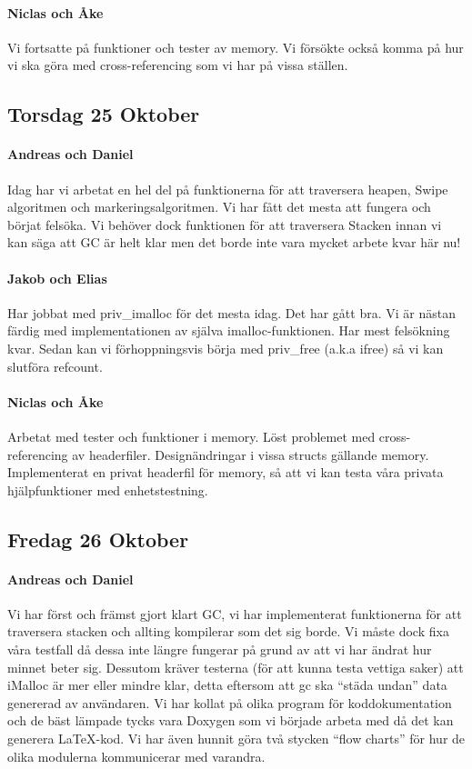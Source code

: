 \documentclass{article}
\begin{document}
\paragraph*{Niclas och Åke} Vi fortsatte på funktioner och tester av memory. Vi försökte också komma på hur vi ska göra med cross-referencing som vi har på vissa ställen.

\subsection{Torsdag 25 Oktober}

\paragraph*{Andreas och Daniel} Idag har vi arbetat en hel del på funktionerna för att traversera heapen, Swipe algoritmen och markeringsalgoritmen. Vi har fått det mesta att fungera och börjat felsöka. Vi behöver dock funktionen för att traversera Stacken innan vi kan säga att GC är helt klar men det borde inte vara mycket arbete kvar här nu!

\paragraph*{Jakob och Elias} Har jobbat med priv\_imalloc för det mesta idag. Det har gått bra. Vi är nästan färdig med implementationen av själva imalloc-funktionen. Har mest felsökning kvar. Sedan kan vi förhoppningsvis börja med priv\_free (a.k.a ifree) så vi kan slutföra refcount.


\paragraph*{Niclas och Åke} Arbetat med tester och funktioner i memory. Löst problemet med cross-referencing av headerfiler. Designändringar i vissa structs gällande memory. Implementerat en privat headerfil för memory, så att vi kan testa våra privata hjälpfunktioner med enhetstestning.

\subsection{Fredag 26 Oktober}

\paragraph*{Andreas och Daniel} Vi har först och främst gjort klart GC, vi har implementerat funktionerna för att traversera stacken och allting kompilerar som det sig borde. Vi måste dock fixa våra testfall då dessa inte längre fungerar på grund av att vi har ändrat hur minnet beter sig. Dessutom kräver testerna (för att kunna testa vettiga saker) att iMalloc är mer eller mindre klar, detta eftersom att gc ska “städa undan” data genererad av användaren. Vi har kollat på olika program för koddokumentation och de bäst lämpade tycks vara Doxygen som vi började arbeta med då det kan generera \LaTeX-kod. Vi har även hunnit göra två stycken “flow charts” för hur de olika modulerna kommunicerar med varandra.
\end{document}
